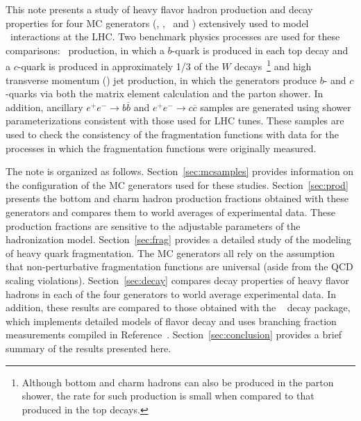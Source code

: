 This note presents a study of heavy flavor hadron production and decay properties for four
MC generators (\PythiaE, \Pythia, \Herwigpp\  and \Herwig)  extensively used to 
model \pp\ interactions at the LHC.  Two benchmark physics processes are used for
these comparisons:  \ttbar\ production, in which a $b$-quark is produced in each top
decay and a $c$-quark is produced in approximately 1/3 of the $W$ decays~\footnote{Although
bottom and charm hadrons can also be produced in the parton shower, the rate for such
production is small when compared to that produced in the top decays.}  and
high transverse momentum (\pT) jet production, in which the generators produce
$b$- and $c$-quarks via both the matrix element calculation and the parton shower.  
In addition, ancillary 
$e^+e^-\rightarrow b\overline b$  and $e^+e^-\rightarrow c\overline c$ samples are generated using 
shower parameterizations consistent with those used for LHC tunes.  These samples are used to 
check the consistency of the fragmentation functions with data for the processes in which the
fragmentation functions were originally measured.


The note is organized as follows.  Section~\ref{sec:mcsamples} provides information on the 
configuration of the MC generators used for these studies. 
Section~\ref{sec:prod} presents
the bottom and charm hadron production fractions obtained with these generators and compares them
to world averages of experimental data.  
These production fractions are sensitive to the adjustable parameters of the hadronization model.
Section~\ref{sec:frag} provides a detailed study of the modeling of heavy quark fragmentation.  
The MC generators all rely on the assumption that non-perturbative fragmentation 
functions are universal (aside from the QCD scaling violations).
Section~\ref{sec:decay} compares 
decay properties of heavy flavor hadrons in each of the four generators to world average experimental data.
In addition, these results are compared to those obtained with the
\EvtGen~\cite{Lange:2001uf} decay package, which implements detailed models of flavor decay and
uses branching fraction measurements compiled in Reference~\cite{PhysRevD.86.010001}.
Section~\ref{sec:conclusion} provides a brief summary of the results presented here.


